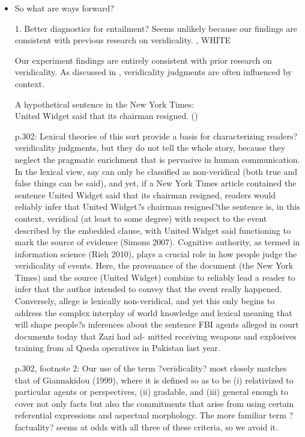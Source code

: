 \documentclass[11pt,fleqn]{article}
\newcommand{\6}{\mbox{$[\hspace*{-.6mm}[$}}
\newcommand{\9}{\mbox{$]\hspace*{-.6mm}]$}}
\begin{document}
{\begin{itemize}
\item So what are ways forward? 

1. Better diagnostics for entailment? Seems unlikely because our findings are consistent with previous research on veridicality. \citealt{demarneffe-etal2012}, WHITE

Our experiment findings are entirely consistent with prior research on veridicality. As discussed in \citealt{demarneffe-etal2012}, veridicality judgments are often influenced by context. 

\begin{exe}
\ex A hypothetical sentence in the New York Times: \\ United Widget said that its chairman resigned. \hfill (\citealt[302]{demarneffe-etal2012})
\end{exe}

p.302: Lexical theories of this sort provide a basis for characterizing readers? veridicality judgments, but they do not tell the whole story, because they neglect the pragmatic enrichment that is pervasive in human communication. In the lexical view, say can only be classified as non-veridical (both true and false things can be said), and yet, if a New York Times article contained the sentence United Widget said that its chairman resigned, readers would reliably infer that United Widget?s chairman resigned?the sentence is, in this context, veridical (at least to some degree) with respect to the event described by the embedded clause, with United Widget said functioning to mark the source of evidence (Simons 2007). Cognitive authority, as termed in information science (Rieh 2010), plays a crucial role in how people judge the veridicality of events. Here, the provenance of the document (the New York Times) and the source (United Widget) combine to reliably lead a reader to infer that the author intended to convey that the event really happened. Conversely, allege is lexically non-veridical, and yet this only begins to address the complex interplay of world knowledge and lexical meaning that will shape people?s inferences about the sentence FBI agents alleged in court documents today that Zazi had ad- mitted receiving weapons and explosives training from al Qaeda operatives in Pakistan last year.

p.302, footnote 2: Our use of the term ?veridicality? most closely matches that of Giannakidou (1999), where it is defined so as to be (i) relativized to particular agents or perspectives, (ii) gradable, and (iii) general enough to cover not only facts but also the commitments that arise from using certain referential expressions and aspectual morphology. The more familiar term ?factuality? seems at odds with all three of these criteria, so we avoid it.




\end{itemize}}
\end{document}
